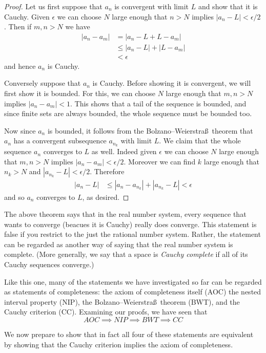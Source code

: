 \documentclass[11pt,oneside]{amsbook}
\theoremstyle{definition}
\theoremstyle{plain}
\theoremstyle{definition}
\theoremstyle{remark}
\numberwithin{equation}{section}
\numberwithin{figure}{section}
\begin{document}
\begin{proof}
  Let us first suppose that $a_n$ is convergent with limit $L$ and show that it is Cauchy. Given $\epsilon$ we can choose $N$ large enough that $n>N$ implies $|a_n-L|<\epsilon/2$. Then if $m,n>N$ we have
  \begin{align*}
    |a_n-a_m|&= |a_n-L+L-a_m|\\
             &\leq |a_n-L|+|L-a_m|\\
             &<\epsilon
  \end{align*}
  and hence $a_n$ is Cauchy.
  
  Conversely suppose that $a_n$ is Cauchy. Before showing it is convergent, we will first show it is bounded. For this, we can choose $N$ large enough that $m,n>N$ implies $|a_n-a_m|<1$. This shows that a tail of the sequence is bounded, and since finite sets are always bounded, the whole sequence must be bounded too.

  Now since $a_n$ is bounded, it follows from the Bolzano--Weierstra\ss\ theorem that $a_n$ has a convergent subsequence $a_{n_k}$ with limit $L$. We claim that the whole sequence $a_n$ converges to $L$ as well. Indeed given $\epsilon$ we can choose $N$ large enough that $m,n>N$ implies $|a_n-a_m|<\epsilon/2$. Moreover we can find $k$ large enough that $n_k>N$ and $|a_{n_k}-L|<\epsilon/2$. Therefore
  \begin{align*}
    |a_n-L|&\leq|a_n-a_{n_k}|+|a_{n_k}-L|<\epsilon
  \end{align*}
  and so $a_n$ converges to $L$, as desired.
\end{proof}

The above theorem says that in the real number system, every sequence that wants to converge (beacues it is Cauchy) really does converge. This statement is false if you restrict to the just the rational number system. Rather, the statement can be regarded as another way of saying that the real number system is complete. (More generally, we say that a space is \emph{Cauchy complete} if all of its Cauchy sequences converge.)

Like this one, many of the statements we have investigated so far can be regarded as statements of completeness: the axiom of completeness itself (AOC) the nested interval property (NIP), the Bolzano--Weierstra\ss\ theorem (BWT), and the Cauchy criterion (CC). Examining our proofs, we have seen that
\[AOC\implies NIP\implies BWT\implies CC
\]

We now prepare to show that in fact all four of these statements are equivalent by showing that the Cauchy criterion implies the axiom of completeness.
\end{document}

